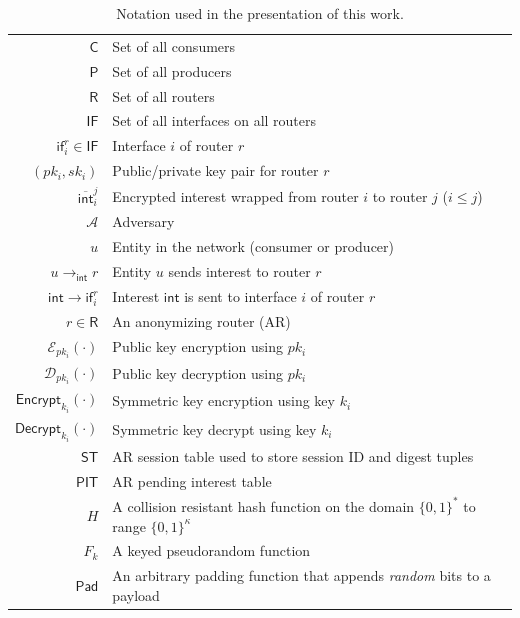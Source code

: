 \documentclass[10pt]{article}
\begin{document}
\begin{table}
\centering
\caption{Notation used in the presentation of this work.}
\label{tab:notation}
  \begin{tabular}{| r | l |} \hline
  $\mathsf{C}$ & Set of all consumers  \\
  $\mathsf{P}$ & Set of all producers  \\ 
  $\mathsf{R}$ & Set of all routers  \\
  $\mathsf{IF}$ & Set of all interfaces on all routers  \\
  $\mathsf{if}_i^r \in \mathsf{IF}$ & Interface $i$ of router $r$  \\
  $(pk_i, sk_i)$ & Public/private key pair for router $r$  \\
  $\overline{\mathsf{int}}_{i}^{j}$ & Encrypted interest wrapped from router $i$ to router $j$ ($i \leq j$)  \\
  $\mathcal{A}$ & Adversary \\ 
  $u$ & Entity in the network (consumer or producer) \\
  $u \to_{\mathsf{int}} r$ & Entity $u$ sends interest to router $r$  \\ 
  $\mathsf{int} \to \mathsf{if}_i^r$ & Interest $\mathsf{int}$ is sent to interface $i$ of router $r$ \\
  $r \in \mathsf{R}$ & An anonymizing router (AR) \\ 
  $\mathcal{E}_{pk_i}(\cdot)$ & Public key encryption using $pk_i$ \\ 
  $\mathcal{D}_{pk_i}(\cdot)$ & Public key decryption using $pk_i$ \\ 
  $\mathsf{Encrypt}_{k_i}(\cdot)$ & Symmetric key encryption using key $k_i$ \\ 
  $\mathsf{Decrypt}_{k_i}(\cdot)$ & Symmetric key decrypt using key $k_i$ \\ 
  $\mathsf{ST}$ & AR session table used to store session ID and digest tuples \\
  $\mathsf{PIT}$ & AR pending interest table \\
  $H$ & A collision resistant hash function on the domain $\{0,1\}^*$ to range $\{0,1\}^{\kappa}$ \\
  $F_k$ & A keyed pseudorandom function \\ 
  $\mathsf{Pad}$ & An arbitrary padding function that appends \emph{random} bits to a payload \\ \hline
  \end{tabular}
\end{table}
\end{document}
